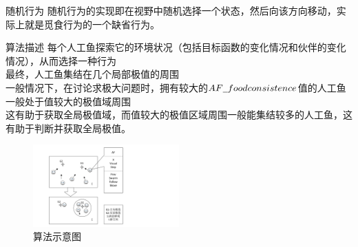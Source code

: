 \documentclass[a4paper, 11pt]{article}
\begin{document}
\begin{section}
\begin{subsection}
		\small{随机行为}
		随机行为的实现即在视野中随机选择一个状态，然后向该方向移动，实际上就是觅食行为的一个缺省行为。
	\end{subsection}
	\begin{subsection}{算法描述}
	每个人工鱼探索它的环境状况（包括目标函数的变化情况和伙伴的变化情况），从而选择一种行为\\最终，人工鱼集结在几个局部极值的周围\\一般情况下，在讨论求极大问题时，拥有较大的$AF\underline{\hspace{0.5em}}foodconsistence$值的人工鱼一般处于值较大的极值域周围\\这有助于获取全局极值域，而值较大的极值区域周围一般能集结较多的人工鱼，这有助于判断并获取全局极值。
		\begin{figure}[htbp]
			\centering
			\includegraphics[width=0.5\textwidth]{../pic/fish3.pdf}
			\caption{算法示意图}
		\end{figure}
	\end{subsection}
\end{section}
\end{document}
